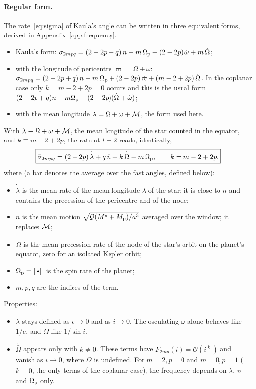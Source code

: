 \paragraph{Regular form.} The rate~\eqref{eq:sigma} of Kaula's angle can be written in three equivalent forms, derived in Appendix~\ref{app:frequency}:
\begin{itemize}
  \item Kaula's form: $\sigma_{2mpq}=(2-2p+q)\,n-m\,\Omega_{\mathrm p}+(2-2p)\,\dot\omega+m\,\dot\Omega$;
  \item with the longitude of pericentre $\varpi=\Omega+\omega$: $\sigma_{2mpq}=(2-2p+q)\,n-m\,\Omega_{\mathrm p}+(2-2p)\,\dot\varpi+(m-2+2p)\,\dot\Omega$. In the coplanar case only $k=m-2+2p=0$ occurs and this is the usual form $(2-2p+q)n-m\Omega_{\mathrm p}+(2-2p)(\dot\Omega+\dot\omega)$;
  \item with the mean longitude $\lambda=\Omega+\omega+\mathcal{M}$, the form used here.
\end{itemize}
With $\lambda\equiv\Omega+\omega+\mathcal{M}$, the mean longitude of the star counted in the equator, and $k\equiv m-2+2p$, the rate at $l=2$ reads, identically,
\begin{equation}
  \boxed{\bar\sigma_{2mpq}=(2-2p)\,\dot{\bar\lambda}+q\,\bar n+k\,\dot{\bar\Omega}-m\,\Omega_{\mathrm p},\qquad k=m-2+2p.} \label{eq:sigma-regular}
\end{equation}
where (a bar denotes the average over the fast angles, defined below):
\begin{itemize}
  \item $\dot{\bar\lambda}$ is the mean rate of the mean longitude $\lambda$ of the star; it is close to $n$ and contains the precession of the pericentre and of the node;
  \item $\bar n$ is the mean motion $\sqrt{\mathcal{G}(M^\star+M_{\mathrm p})/a^3}$ averaged over the window; it replaces $\dot{\mathcal{M}}$;
  \item $\dot{\bar\Omega}$ is the mean precession rate of the node of the star's orbit on the planet's equator, zero for an isolated Kepler orbit;
  \item $\Omega_{\mathrm p}=\|\mathbf s\|$ is the spin rate of the planet;
  \item $m,p,q$ are the indices of the term.
\end{itemize}
Properties:
\begin{itemize}
  \item $\dot{\bar\lambda}$ stays defined as $e\to0$ and as $i\to0$. The osculating $\dot\omega$ alone behaves like $1/e$, and $\dot\Omega$ like $1/\sin i$.
  \item $\dot{\bar\Omega}$ appears only with $k\neq0$. These terms have $F_{2mp}(i)=\mathcal O(i^{|k|})$ and vanish as $i\to0$, where $\Omega$ is undefined. For $m=2,p=0$ and $m=0,p=1$ ($k=0$, the only terms of the coplanar case), the frequency depends on $\dot{\bar\lambda}$, $\bar n$ and $\Omega_{\mathrm p}$ only.
\end{itemize}

